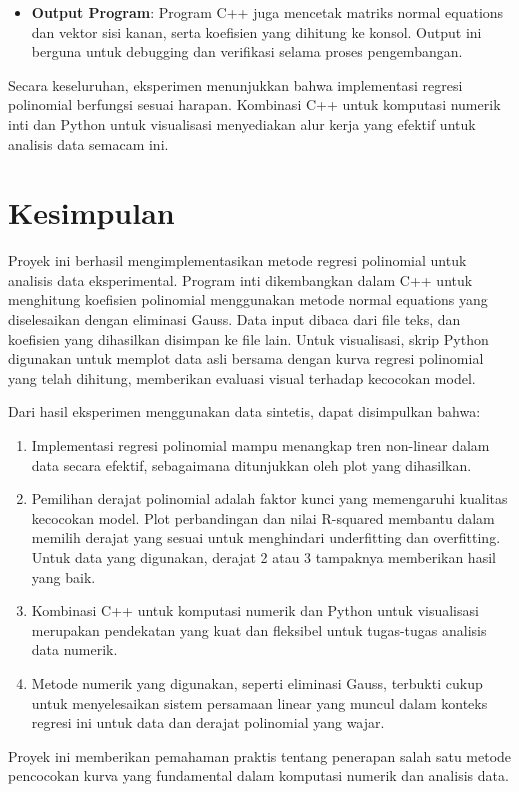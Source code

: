 \documentclass[conference]{IEEEtran}
\begin{document}
\begin{itemize}
    \item \textbf{Output Program}: Program C++ juga mencetak matriks normal equations dan vektor sisi kanan, serta koefisien yang dihitung ke konsol. Output ini berguna untuk debugging dan verifikasi selama proses pengembangan.
\end{itemize}

Secara keseluruhan, eksperimen menunjukkan bahwa implementasi regresi polinomial berfungsi sesuai harapan. Kombinasi C++ untuk komputasi numerik inti dan Python untuk visualisasi menyediakan alur kerja yang efektif untuk analisis data semacam ini.

\section{Kesimpulan}
Proyek ini berhasil mengimplementasikan metode regresi polinomial untuk analisis data eksperimental. Program inti dikembangkan dalam C++ untuk menghitung koefisien polinomial menggunakan metode normal equations yang diselesaikan dengan eliminasi Gauss. Data input dibaca dari file teks, dan koefisien yang dihasilkan disimpan ke file lain. Untuk visualisasi, skrip Python digunakan untuk memplot data asli bersama dengan kurva regresi polinomial yang telah dihitung, memberikan evaluasi visual terhadap kecocokan model.

Dari hasil eksperimen menggunakan data sintetis, dapat disimpulkan bahwa:
\begin{enumerate}
    \item Implementasi regresi polinomial mampu menangkap tren non-linear dalam data secara efektif, sebagaimana ditunjukkan oleh plot yang dihasilkan.
    \item Pemilihan derajat polinomial adalah faktor kunci yang memengaruhi kualitas kecocokan model. Plot perbandingan dan nilai R-squared membantu dalam memilih derajat yang sesuai untuk menghindari underfitting dan overfitting. Untuk data yang digunakan, derajat 2 atau 3 tampaknya memberikan hasil yang baik.
    \item Kombinasi C++ untuk komputasi numerik dan Python untuk visualisasi merupakan pendekatan yang kuat dan fleksibel untuk tugas-tugas analisis data numerik.
    \item Metode numerik yang digunakan, seperti eliminasi Gauss, terbukti cukup untuk menyelesaikan sistem persamaan linear yang muncul dalam konteks regresi ini untuk data dan derajat polinomial yang wajar.
\end{enumerate}
Proyek ini memberikan pemahaman praktis tentang penerapan salah satu metode pencocokan kurva yang fundamental dalam komputasi numerik dan analisis data.
\end{document}
